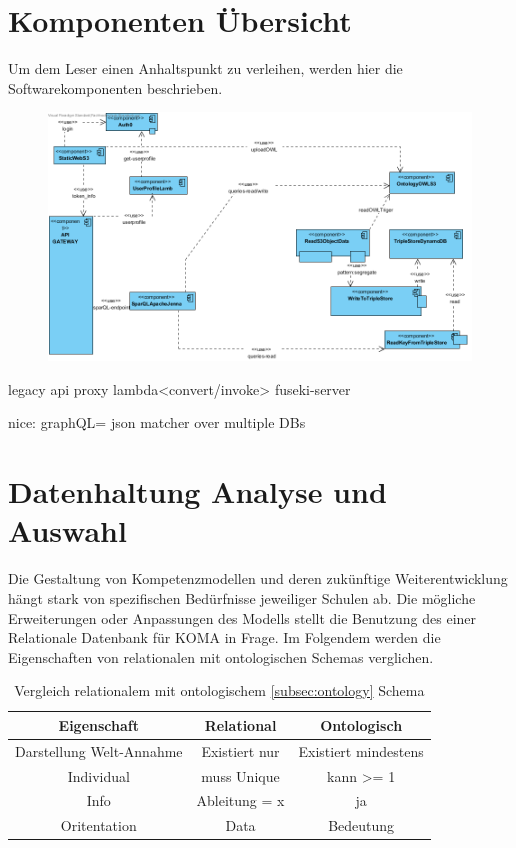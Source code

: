 \documentclass[
12pt,
english,
ngerman,
headsepline,
twoside,
openright,
numbers=noenddot,version=first
]{scrreprt}
\providecommand{\tabularnewline}{\\}
\begin{document}
\section{Komponenten Übersicht}
\label{sec:components}
Um dem Leser einen Anhaltspunkt zu verleihen, werden hier die Softwarekomponenten beschrieben.

\begin{figure}[H]
	\includegraphics[width=\linewidth]{pics/arch-comp.png}
\end{figure}

legacy api proxy\cite{serverlessArchAWS}
lambda<convert/invoke> fuseki-server\label{komponenten:fuseki}

nice: graphQL= json matcher over multiple DBs




\section{Datenhaltung Analyse und Auswahl}

Die Gestaltung von Kompetenzmodellen und deren zukünftige Weiterentwicklung hängt stark von spezifischen Bedürfnisse jeweiliger Schulen ab. Die mögliche Erweiterungen oder Anpassungen des Modells stellt die Benutzung des einer Relationale Datenbank für \acrshort{KOMA} in Frage. Im Folgendem werden die Eigenschaften von relationalen mit ontologischen Schemas verglichen.


\begin{table}[h]
	\caption{Vergleich relationalem mit ontologischem \ref{subsec:ontology} Schema}
	
	\centering{}
	\begin{tabular}{ccc}
		\noalign{\vskip\doublerulesep}
		Eigenschaft & Relational & Ontologisch \tabularnewline[\doublerulesep]
		\hline\noalign{\vskip\doublerulesep}
		Darstellung Welt-Annahme & Existiert nur & Existiert mindestens \tabularnewline[\doublerulesep]
		\noalign{\vskip\doublerulesep}
		Individual & muss Unique & kann >= 1 \tabularnewline[\doublerulesep]
		\noalign{\vskip\doublerulesep}
		Info & Ableitung = x & ja \tabularnewline[\doublerulesep]
		\noalign{\vskip\doublerulesep}
		Oritentation & Data & Bedeutung \tabularnewline[\doublerulesep]
		
	\end{tabular}
\end{table}
\end{document}

